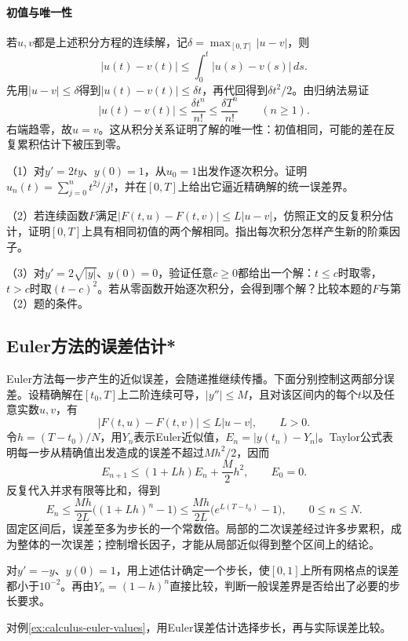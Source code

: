 \paragraph{初值与唯一性} \mbox{}

若\(u,v\)都是上述积分方程的连续解，记\(\delta=\max_{[0,T]}|u-v|\)，则
\begin{equation*}
 |u(t)-v(t)|\le\int_0^t|u(s)-v(s)|\,ds.
\end{equation*}
先用\(|u-v|\le\delta\)得到\(|u(t)-v(t)|\le\delta t\)，再代回得到\(\delta t^2/2\)。由归纳法易证
\begin{equation*}
 |u(t)-v(t)|\le\frac{\delta t^n}{n!}\le\frac{\delta T^n}{n!}\qquad(n\ge1).
\end{equation*}
右端趋零，故\(u=v\)。这从积分关系证明了解的唯一性：初值相同，可能的差在反复累积估计下被压到零。

\begin{exercise}
\mbox{}\par\nobreak

（1）对\(y'=2ty\)、\(y(0)=1\)，从\(u_0=1\)出发作逐次积分。证明\(u_n(t)=\sum_{j=0}^nt^{2j}/j!\)，并在\([0,T]\)上给出它逼近精确解的统一误差界。

（2）若连续函数\(F\)满足\(|F(t,u)-F(t,v)|\le L|u-v|\)，仿照正文的反复积分估计，证明\([0,T]\)上具有相同初值的两个解相同。指出每次积分怎样产生新的阶乘因子。

\begin{samepage}
（3）对\(y'=2\sqrt{|y|}\)、\(y(0)=0\)，验证任意\(c\ge0\)都给出一个解：\(t\le c\)时取零，\(t>c\)时取\((t-c)^2\)。若从零函数开始逐次积分，会得到哪个解？比较本题的\(F\)与第（2）题的条件。
\end{samepage}
\end{exercise}
\endgroup

\subsection{Euler方法的误差估计*}
\label{subsec:calculus-euler-error}

Euler方法每一步产生的近似误差，会随递推继续传播。下面分别控制这两部分误差。设精确解在\([t_0,T]\)上二阶连续可导，\(|y''|\le M\)，且对该区间内的每个\(t\)以及任意实数\(u,v\)，有
\begin{equation*}
 |F(t,u)-F(t,v)|\le L|u-v|,\qquad L>0.
\end{equation*}
令\(h=(T-t_0)/N\)，用\(Y_n\)表示Euler近似值，\(E_n=|y(t_n)-Y_n|\)。Taylor公式表明每一步从精确值出发造成的误差不超过\(Mh^2/2\)，因而
\begin{equation*}
 E_{n+1}\le(1+Lh)E_n+\frac M2h^2,\qquad E_0=0.
\end{equation*}
反复代入并求有限等比和，得到
\begin{equation*}
 E_n\le\frac{Mh}{2L}\bigl((1+Lh)^n-1\bigr)
 \le\frac{Mh}{2L}\bigl(e^{L(T-t_0)}-1\bigr),\qquad 0\le n\le N.
\end{equation*}
固定区间后，误差至多为步长的一个常数倍。局部的二次误差经过许多步累积，成为整体的一次误差；控制增长因子，才能从局部近似得到整个区间上的结论。

\begin{example}
对\(y'=-y\)、\(y(0)=1\)，用上述估计确定一个步长，使\([0,1]\)上所有网格点的误差都小于\(10^{-2}\)。再由\(Y_n=(1-h)^n\)直接比较，判断一般误差界是否给出了必要的步长要求。
\end{example}

\begin{exercise}
对例\ref{ex:calculus-euler-values}，用Euler误差估计选择步长，再与实际误差比较。
\end{exercise}
\endgroup
